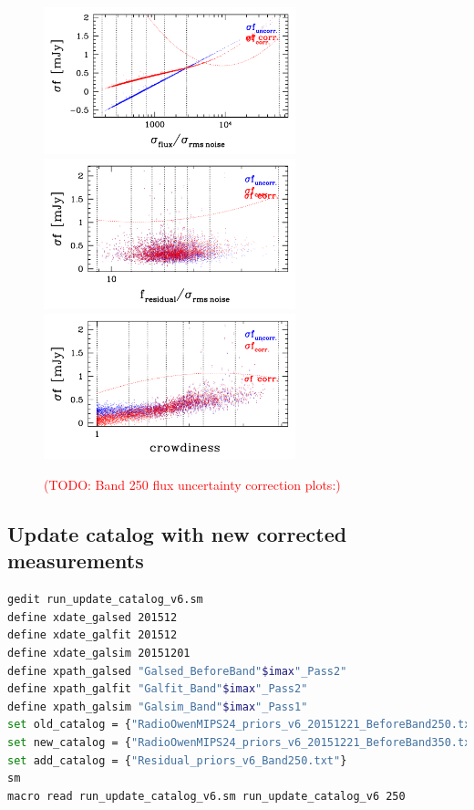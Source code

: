 \documentclass[11pt,a4paper]{article}
\begin{document}
\begin{figure}[H]
	\caption{
		\textcolor{red}{(TODO: Band 250 flux uncertainty correction plots:)}
	}
	\includegraphics[width=0.65\textwidth]{galsim_250_dfcorr_1}
	\includegraphics[width=0.65\textwidth]{galsim_250_dfcorr_2}
	\includegraphics[width=0.65\textwidth]{galsim_250_dfcorr_3}
\end{figure}

\subsection{Update catalog with new corrected measurements}

\begin{lstlisting}[language=bash]
gedit run_update_catalog_v6.sm
define xdate_galsed 201512
define xdate_galfit 201512
define xdate_galsim 20151201
define xpath_galsed "Galsed_BeforeBand"$imax"_Pass2"
define xpath_galfit "Galfit_Band"$imax"_Pass2"
define xpath_galsim "Galsim_Band"$imax"_Pass1"
set old_catalog = {"RadioOwenMIPS24_priors_v6_20151221_BeforeBand250.txt"}
set new_catalog = {"RadioOwenMIPS24_priors_v6_20151221_BeforeBand350.txt"}
set add_catalog = {"Residual_priors_v6_Band250.txt"}
sm
macro read run_update_catalog_v6.sm run_update_catalog_v6 250
\end{lstlisting}
\end{document}
